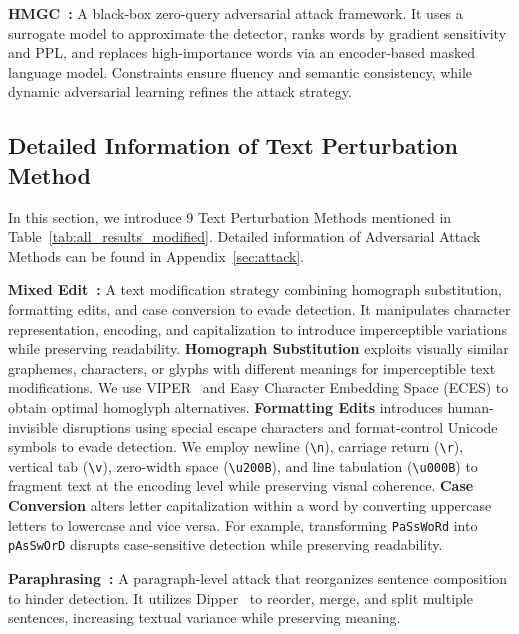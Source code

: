 \noindent
\textbf{HMGC~\cite{zhou2024humanizing}:} A black-box zero-query adversarial attack framework. It uses a surrogate model to approximate the detector, ranks words by gradient sensitivity and PPL, and replaces high-importance words via an encoder-based masked language model. Constraints ensure fluency and semantic consistency, while dynamic adversarial learning refines the attack strategy.

\subsection{Detailed Information of Text Perturbation Method}
\label{sec:pert}
In this section, we introduce 9 Text Perturbation Methods mentioned in Table~\ref{tab:all_results_modified}. Detailed information of Adversarial Attack Methods can be found in Appendix~\ref{sec:attack}.

\noindent
\textbf{Mixed Edit~\cite{wang2024stumbling}:} A text modification strategy combining homograph substitution, formatting edits, and case conversion to evade detection. It manipulates character representation, encoding, and capitalization to introduce imperceptible variations while preserving readability.
\textbf{Homograph Substitution} exploits visually similar graphemes, characters, or glyphs with different meanings for imperceptible text modifications. We use VIPER~\cite{eger2019text} and Easy Character Embedding Space (ECES) to obtain optimal homoglyph alternatives.
\textbf{Formatting Edits} introduces human-invisible disruptions using special escape characters and format-control Unicode symbols to evade detection. We employ newline (\texttt{\textbackslash n}), carriage return (\texttt{\textbackslash r}), vertical tab (\texttt{\textbackslash v}), zero-width space (\texttt{\textbackslash u200B}), and line tabulation (\texttt{\textbackslash u000B}) to fragment text at the encoding level while preserving visual coherence.
\textbf{Case Conversion} alters letter capitalization within a word by converting uppercase letters to lowercase and vice versa. For example, transforming \texttt{PaSsWoRd} into \texttt{pAsSwOrD} disrupts case-sensitive detection while preserving readability.

\noindent
\textbf{Paraphrasing~\cite{wang2024stumbling}:} A paragraph-level attack that reorganizes sentence composition to hinder detection. It utilizes Dipper~\cite{krishna2024paraphrasing} to reorder, merge, and split multiple sentences, increasing textual variance while preserving meaning.

